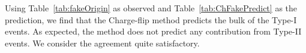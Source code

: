 Using Table~\ref{tab:fakeOrigin} as observed and Table~\ref{tab:ChFakePredict} as the 
prediction, we find that the Charge-flip method predicts the bulk of the Type-I events. As expected,
the method does not predict any contribution from Type-II events. 
We consider the agreement quite satisfactory.

